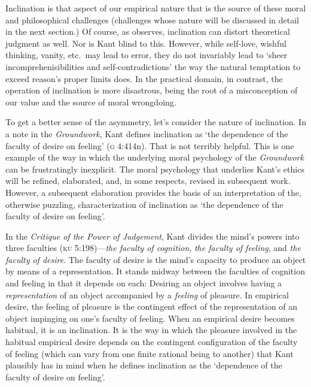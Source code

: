 \documentclass[a4paper,12pt]{article}
\begin{document}
Inclination is that aspect of our empirical nature that is the source of these moral and philosophical challenges (challenges whose nature will be discussed in detail in the next section.) Of course, as \citet[133]{Raz:2001ps} observes, inclination can distort theoretical judgment as well. Nor is Kant blind to this. However, while self-love, wishful thinking, vanity, etc.\ may lead to error, they do not invariably lead to `sheer incomprehenisibilities and self-contradictions' the way the natural temptation to exceed reason's proper limits does. In the practical domain, in contrast, the operation of inclination is more disastrous, being the root of a misconception of our value and the source of moral wrongdoing.

To get a better sense of the asymmetry, let's consider the nature of inclination. In a note in the \emph{Groundwork}, Kant defines inclination as `the dependence of the faculty of desire on feeling' (\textsc{g} 4:414n). That is not terribly helpful. This is one example of the way in which the underlying moral psychology of the \emph{Groundwork} can be frustratingly inexplicit. The moral psychology that underlies Kant's ethics will be refined, elaborated, and, in some respects, revised in subsequent work. However, a subsequent elaboration provides the basis of an interpretation of the, otherwise puzzling, characterization of inclination as `the dependence of the faculty of desire on feeling'.

In the \emph{Critique of the Power of Judgement}, Kant divides the mind's powers into three faculties (\textsc{ku} 5:198)---\emph{the faculty of cognition}, \emph{the faculty of feeling}, and \emph{the faculty of desire}. The faculty of desire is the mind's capacity to produce an object by means of a representation. It stands midway between the faculties of cognition and feeling in that it depends on each: Desiring an object involves having a \emph{representation} of an object accompanied by a \emph{feeling} of pleasure. In empirical desire, the feeling of pleasure is the contingent effect of the representation of an object impinging on one's faculty of feeling. When an empirical desire becomes habitual, it is an inclination. It is the way in which the pleasure involved in the habitual empirical desire depends on the contingent configuration of the faculty of feeling (which can vary from one finite rational being to another) that Kant plausibly has in mind when he defines inclination as the `dependence of the faculty of desire on feeling'.
\end{document}
